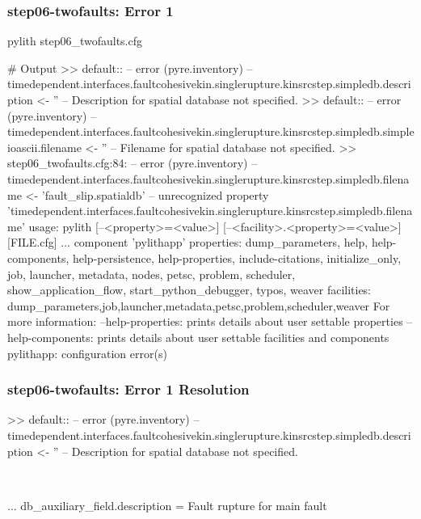 \documentclass[aspectratio=169]{beamer}
\begin{document}
\begin{frame}[fragile]
  \frametitle{{\ttfamily step06-twofaults}: Error 1}

\begin{pyrejournal}
pylith step06_twofaults.cfg

# Output
 >> {default}::
 -- error (pyre.inventory)
 -- timedependent.interfaces.faultcohesivekin.singlerupture.kinsrcstep.simpledb.description <- ''
 -- Description for spatial database not specified.
 >> {default}::
 -- error (pyre.inventory)
 -- timedependent.interfaces.faultcohesivekin.singlerupture.kinsrcstep.simpledb.simpleioascii.filename <- ''
 -- Filename for spatial database not specified.
 >> step06_twofaults.cfg:84:
 -- error (pyre.inventory)
 -- timedependent.interfaces.faultcohesivekin.singlerupture.kinsrcstep.simpledb.filename <- 'fault_slip.spatialdb'
 -- unrecognized property 'timedependent.interfaces.faultcohesivekin.singlerupture.kinsrcstep.simpledb.filename'
usage: pylith [--<property>=<value>] [--<facility>.<property>=<value>] [FILE.cfg] ...
component 'pylithapp'
    properties: dump_parameters, help, help-components, help-persistence, help-properties, include-citations, initialize_only, job, launcher, metadata, nodes, petsc, problem, scheduler, show_application_flow, start_python_debugger, typos, weaver
    facilities: dump_parameters,job,launcher,metadata,petsc,problem,scheduler,weaver
For more information:
  --help-properties: prints details about user settable properties
  --help-components: prints details about user settable facilities and components
pylithapp: configuration error(s)
\end{pyrejournal}

\end{frame}


\begin{frame}[t,fragile]
  \frametitle{{\ttfamily step06-twofaults}: Error 1 Resolution}

  \tserror
  \begin{pyrejournal}
 >> {default}::
 -- error (pyre.inventory)
 -- timedependent.interfaces.faultcohesivekin.singlerupture.kinsrcstep.simpledb.description <- ''
 -- Description for spatial database not specified.
  \end{pyrejournal}

  \pause\\[1pt]

  \begin{cfgcode}
    ...
    db_auxiliary_field.description = Fault rupture for main fault
  \end{cfgcode}

\end{frame}
\end{document}
